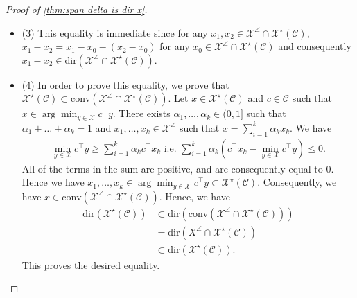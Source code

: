 \documentclass[11pt]{article}
\theoremstyle{plain}
\theoremstyle{definition}
\newcommand{\Vect}{\mathrm{span}~}
\newcommand{\conv}{\mathrm{conv}}
\newcommand{\dualpoly}[2]{#1^\star\left(#2\right)}
\newcommand{\cX}{\mathcal{X}}
\newcommand{\cC}{\mathcal{C}}
\newcommand{\dir}[1]{\mathrm{dir}\left(#1\right)}
\begin{document}
\begin{proof}[Proof of \cref{thm:span delta is dir x}]
\begin{itemize}
\begin{align*}
            x-x'=\sum_{i=1}^{h-1}x_{i+1}-x_i.
        \end{align*}
        All of the terms in the sum above are in set $\eqref{set 1}$ and therefore their sum as well, by linearity. Hence, we indeed have the inclusion.
        \item (3) This equality is immediate since for any $x_1,x_2 \in \cX^\angle\cap \dualpoly{\cX}{\cC}$, $x_1-x_2=x_1 - x_0 -(x_2-x_0)$ for any $x_0\in  \cX^\angle\cap \dualpoly{\cX}{\cC}$ and consequently $x_1-x_2\in \dir{ \cX^\angle\cap \dualpoly{\cX}{\cC}}$. 
        \item (4) In order to prove this equality, we prove that $\dualpoly{\cX}{\cC}\subset \conv(\cX^\angle \cap \dualpoly{\cX}{\cC})$. Let $x\in \dualpoly{\cX}{\cC}$ and $c\in \cC$ such that $x\in \arg\min_{y\in \cX}c^\top y$. There exists $\alpha_1,\dots,\alpha_k\in (0,1]$ such that $\alpha_1+\dots+\alpha_k=1$ and $x_1,\dots,x_k\in \cX^\angle$ such that $x=\sum_{i=1}^{k}\alpha_kx_k$. We have 
        \begin{align*}
            \min_{y\in \cX}c^\top y \geq \sum_{i=1}^{k}\alpha_kc^\top x_k \text{ i.e. }\sum_{i=1}^{k}\alpha_k(c^\top x_k-\min_{y\in \cX}c^\top y)\leq 0.
        \end{align*}
        All of the terms in the sum are positive, and are consequently equal to $0$. Hence we have $x_1,\dots,x_k\in \arg\min_{y\in \cX}c^\top y \subset \dualpoly{\cX}{\cC}$. Consequently, we have $x\in \conv(\cX^\angle \cap \dualpoly{\cX}{\cC})$. Hence, we have 
        \begin{align*}
            \dir{\dualpoly{\cX}{\cC}}&\subset \dir{\conv(\cX^\angle \cap \dualpoly{\cX}{\cC})}\\&=\dir{X^\angle \cap \dualpoly{\cX}{\cC}} \\&\subset \dir{\dualpoly{\cX}{\cC}}.
        \end{align*}
        This proves the desired equality.
    \end{itemize}
\end{proof}
\end{document}
